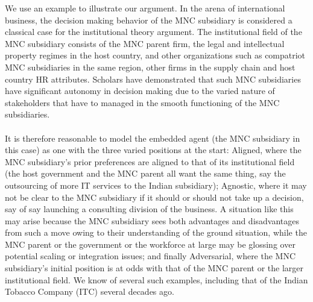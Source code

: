 \documentclass[12pt]{article}
\begin{document}
\noindent We use an example to illustrate our argument. In the arena of international business, the decision making behavior of the MNC subsidiary is considered a classical case for the institutional theory argument. The institutional field of the MNC subsidiary consists of the MNC parent firm, the legal and intellectual property regimes in the host country, and other organizations such as compatriot MNC subsidiaries in the same region, other firms in the supply chain and host country HR attributes. Scholars have demonstrated that such MNC subsidiaries have significant autonomy in decision making due to the varied nature of stakeholders that have to managed in the smooth functioning of the MNC subsidiaries. \\\\
It is therefore reasonable to model the embedded agent (the MNC subsidiary in this case) as one with the three varied positions at the start: Aligned, where the MNC subsidiary's prior preferences are aligned to that of its institutional field (the host government and the MNC parent all want the same thing, say the outsourcing of more IT services to the Indian subsidiary); Agnostic, where it may not be clear to the MNC subsidiary if it should or should not take up a decision, say of say launching a consulting division of the business. A situation like this may arise because the MNC subsidiary sees both advantages and disadvantages from such a move owing to their understanding of the ground situation, while the MNC parent or the government or the workforce at large may be glossing over potential scaling or integration issues; and finally Adversarial, where the MNC subsidiary's initial position is at odds with that of the MNC parent or the larger institutional field. We know of several such examples, including that of the Indian Tobacco Company (ITC) several decades ago. \\\\
\end{document}
